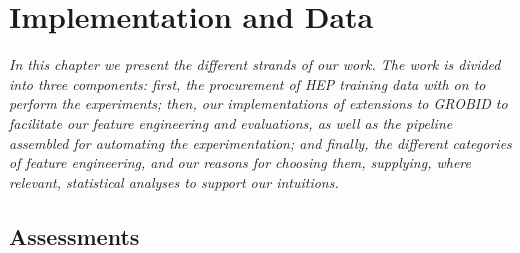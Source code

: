 
\chapter{Implementation and Data} %

\label{Chapter4} %


\emph{In this chapter we present the different strands of our work. The work is divided into three components: first, the procurement of HEP training data with on to perform the experiments; then, our implementations of extensions to GROBID to facilitate our feature engineering and evaluations, as well as the pipeline assembled for automating the experimentation; and finally, the different categories of feature engineering, and our reasons for choosing them, supplying, where relevant, statistical analyses to support our intuitions.}

\section{Assessments}

